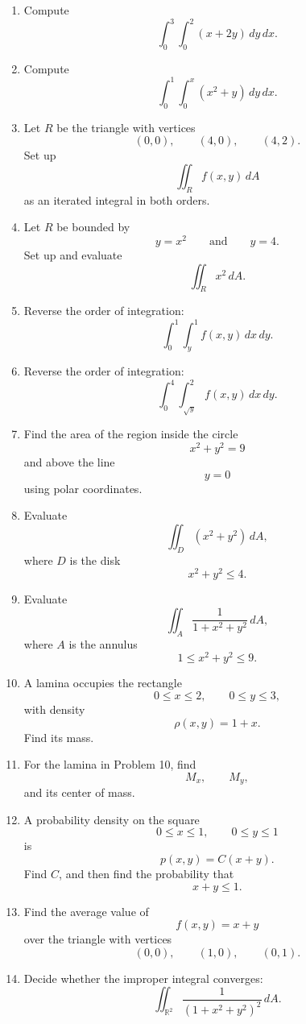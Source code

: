 \begin{enumerate}
\item Compute
\[
    \int_0^3\int_0^2 (x+2y)\,dy\,dx.
\]

\item Compute
\[
    \int_0^1\int_0^x (x^2+y)\,dy\,dx.
\]

\item Let \(R\) be the triangle with vertices
\[
    (0,0),\qquad (4,0),\qquad (4,2).
\]
Set up
\[
    \iint_R f(x,y)\,dA
\]
as an iterated integral in both orders.

\item Let \(R\) be bounded by
\[
    y=x^2
    \qquad\text{and}\qquad
    y=4.
\]
Set up and evaluate
\[
    \iint_R x^2\,dA.
\]

\item Reverse the order of integration:
\[
    \int_0^1\int_y^1 f(x,y)\,dx\,dy.
\]

\item Reverse the order of integration:
\[
    \int_0^4\int_{\sqrt y}^{2} f(x,y)\,dx\,dy.
\]

\item Find the area of the region inside the circle
\[
    x^2+y^2=9
\]
and above the line
\[
    y=0
\]
using polar coordinates.

\item Evaluate
\[
    \iint_D (x^2+y^2)\,dA,
\]
where \(D\) is the disk
\[
    x^2+y^2\le 4.
\]

\item Evaluate
\[
    \iint_A \frac{1}{1+x^2+y^2}\,dA,
\]
where \(A\) is the annulus
\[
    1\le x^2+y^2\le 9.
\]

\item A lamina occupies the rectangle
\[
    0\le x\le2,
    \qquad
    0\le y\le3,
\]
with density
\[
    \rho(x,y)=1+x.
\]
Find its mass.

\item For the lamina in Problem 10, find
\[
    M_x,\qquad M_y,
\]
and its center of mass.

\item A probability density on the square
\[
    0\le x\le1,\qquad 0\le y\le1
\]
is
\[
    p(x,y)=C(x+y).
\]
Find \(C\), and then find the probability that
\[
    x+y\le1.
\]

\item Find the average value of
\[
    f(x,y)=x+y
\]
over the triangle with vertices
\[
    (0,0),\qquad (1,0),\qquad (0,1).
\]

\item Decide whether the improper integral converges:
\[
    \iint_{\mathbb R^2}\frac{1}{(1+x^2+y^2)^2}\,dA.
\]


\end{enumerate}
